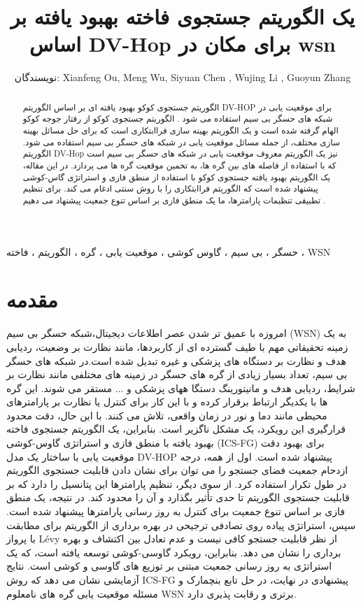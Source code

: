 \documentclass{CSICC2020}
\title{
یک الگوریتم جستجوی فاخته بهبود یافته بر اساس DV-Hop برای مکان در wsn
}
\date{}
\author{نویسندگان: Xianfeng Ou, Meng Wu, Siyuan Chen , Wujing Li , Guoyun Zhang }
\begin{document}
\maketitle
\begin{abstract}
الگوریتم جستجوی کوکو بهبود یافته ای بر اساس الگوریتم DV-HOP برای موقعیت یابی در شبکه های حسگر بی سیم استفاده می شود . الگوریتم جستجوی کوکو از رفتار جوجه کوکو الهام گرفته شده است و یک الگوریتم بهینه سازی فراابتکاری است که برای حل مسائل بهینه سازی مختلف، از جمله مسائل موقعیت یابی در شبکه های حسگر بی سیم استفاده می شود. الگوریتم DV-Hop نیز یک الگوریتم معروف موقعیت یابی در شبکه های حسگر بی سیم است که با استفاده از فاصله های بین گره ها، به تخمین موقعیت گره ها می پردازد. در این مقاله، یک الگوریتم بهبود یافته جستجوی کوکو با استفاده از منطق فازی و استراتژی گاس-کوشی پیشنهاد شده است که الگوریتم فراابتکاری را با روش سنتی ادغام می کند. برای تنظیم تطبیقی تنظیمات پارامترها، ما یک منطق فازی بر اساس تنوع جمعیت پیشنهاد می دهیم .

 \end{abstract}
\begin{keywords}
حسگر ، بی سیم ، گاوس کوشی ، موقعیت یابی ، گره ، الگوریتم ، فاخته ، WSN
\end{keywords}

\section{مقدمه}
امروزه با عمیق تر شدن عصر اطلاعات دیجیتال،شبکه حسگر بی سیم (WSN) به یک زمینه تحقیقاتی مهم با طیف گسترده ای از کاربردها، مانند نظارت بر وضعیت، ردیابی هدف و نظارت بر دستگاه های پزشکی و غیره تبدیل شده است.در شبکه های حسگر بی سیم، تعداد بسیار زیادی از گره های حسگر در زمینه های مختلفی مانند نظارت بر شرایط، ردیابی هدف و مانیتورینگ دستگا ههای پزشکی و ... مستقر می شوند. این گره ها با یکدیگر ارتباط برقرار کرده و با این کار برای کنترل یا نظارت بر پارامترهای محیطی مانند دما و نور در زمان واقعی، تلاش می کنند. با این حال، دقت محدود قرارگیری این رویکرد، یک مشکل ناگزیر است. بنابراین، یک الگوریتم جستجوی فاخته بهبود یافته با منطق فازی و استراتژی گاوس-کوشی (ICS-FG) برای بهبود دقت موقعیت یابی با ساختار یک مدل DV-HOP پیشنهاد شده است. اول از همه، درجه ازدحام جمعیت فضای جستجو را می توان برای نشان دادن قابلیت جستجوی الگوریتم در طول تکرار استفاده کرد. از سوی دیگر، تنظیم پارامترها این پتانسیل را دارد که بر قابلیت جستجوی الگوریتم تا حدی تأثیر بگذارد و آن را محدود کند. در نتیجه، یک منطق فازی بر اساس تنوع جمعیت برای کنترل به روز رسانی پارامترها پیشنهاد شده است. سپس، استراتژی پیاده روی تصادفی ترجیحی در بهره برداری از الگوریتم برای مطابقت با پرواز   Lévy  از نظر قابلیت جستجو کافی نیست و عدم تعادل بین اکتشاف و بهره برداری را نشان می دهد. بنابراین، رویکرد گاوسی-کوشی توسعه یافته است، که یک استراتژی به روز رسانی جمعیت مبتنی بر توزیع های گاوسی و کوشی است. نتایج آزمایشی نشان می دهد که روش ICS-FG  پیشنهادی در نهایت، در حل تابع بنچمارک و مسئله موقعیت یابی گره های نامعلوم WSN برتری و رقابت پذیری دارد.
\end{document}
